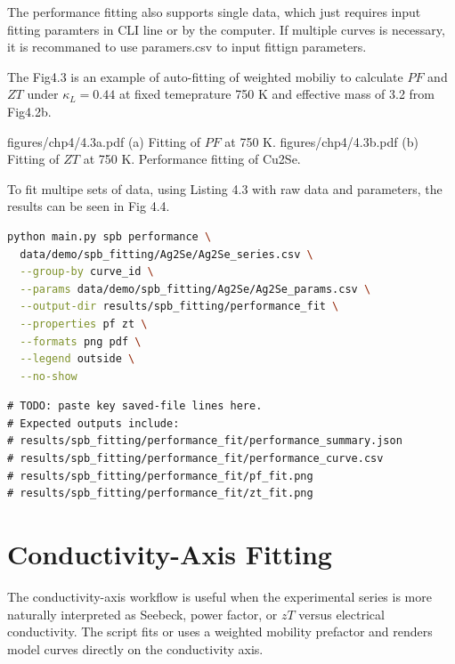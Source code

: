 The performance fitting also supports single data, which just requires input fitting paramters in CLI line or by the computer.
If multiple curves is necessary, it is recommaned to use paramers.csv to input fittign parameters.

The Fig4.3 is an example of auto-fitting of weighted mobiliy to calculate $PF$ and $ZT$ under $\kappa_L = 0.44$ at fixed temeprature 750 K and
effective mass of 3.2 from Fig4.2b.

\twofigureslot
  {figures/chp4/4.3a.pdf}
  {(a) Fitting of $PF$ at 750 K.}
  {figures/chp4/4.3b.pdf}
  {(b) Fitting of $ZT$ at 750 K.}
  {Performance fitting of Cu2Se.}

To fit multipe sets of data, using Listing 4.3 with raw data and parameters, the results can be seen in Fig 4.4.


\begin{lstlisting}[language=bash,caption={Command slot: SPB performance fit.}]
python main.py spb performance \
  data/demo/spb_fitting/Ag2Se/Ag2Se_series.csv \
  --group-by curve_id \
  --params data/demo/spb_fitting/Ag2Se/Ag2Se_params.csv \
  --output-dir results/spb_fitting/performance_fit \
  --properties pf zt \
  --formats png pdf \
  --legend outside \
  --no-show
\end{lstlisting}

\begin{lstlisting}[caption={Terminal-output slot: performance fit.}]
# TODO: paste key saved-file lines here.
# Expected outputs include:
# results/spb_fitting/performance_fit/performance_summary.json
# results/spb_fitting/performance_fit/performance_curve.csv
# results/spb_fitting/performance_fit/pf_fit.png
# results/spb_fitting/performance_fit/zt_fit.png
\end{lstlisting}

\section{Conductivity-Axis Fitting}

The conductivity-axis workflow is useful when the experimental series is more
naturally interpreted as Seebeck, power factor, or $zT$ versus electrical
conductivity. The script fits or uses a weighted mobility prefactor and renders
model curves directly on the conductivity axis.


